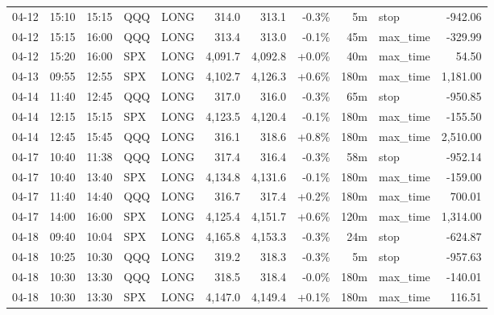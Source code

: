 \documentclass[11pt,a4paper,twoside]{article}
\begin{document}
\begin{center}
\begin{longtable}{>{\color{txtmain}}l l l l l r r r r >{\color{txtmain}}l r}
04-12 & 15:10 & 15:15 & QQQ & LONG & 314.0 & 313.1 & \textcolor{lossred}{-0.3\%} & 5m & stop & \textcolor{lossred}{-942.06} \\
04-12 & 15:15 & 16:00 & QQQ & LONG & 313.4 & 313.0 & \textcolor{lossred}{-0.1\%} & 45m & max\_time & \textcolor{lossred}{-329.99} \\
04-12 & 15:20 & 16:00 & SPX & LONG & 4,091.7 & 4,092.8 & \textcolor{wingreen}{+0.0\%} & 40m & max\_time & \textcolor{wingreen}{54.50} \\
04-13 & 09:55 & 12:55 & SPX & LONG & 4,102.7 & 4,126.3 & \textcolor{wingreen}{+0.6\%} & 180m & max\_time & \textcolor{wingreen}{1,181.00} \\
04-14 & 11:40 & 12:45 & QQQ & LONG & 317.0 & 316.0 & \textcolor{lossred}{-0.3\%} & 65m & stop & \textcolor{lossred}{-950.85} \\
04-14 & 12:15 & 15:15 & SPX & LONG & 4,123.5 & 4,120.4 & \textcolor{lossred}{-0.1\%} & 180m & max\_time & \textcolor{lossred}{-155.50} \\
04-14 & 12:45 & 15:45 & QQQ & LONG & 316.1 & 318.6 & \textcolor{wingreen}{+0.8\%} & 180m & max\_time & \textcolor{wingreen}{2,510.00} \\
04-17 & 10:40 & 11:38 & QQQ & LONG & 317.4 & 316.4 & \textcolor{lossred}{-0.3\%} & 58m & stop & \textcolor{lossred}{-952.14} \\
04-17 & 10:40 & 13:40 & SPX & LONG & 4,134.8 & 4,131.6 & \textcolor{lossred}{-0.1\%} & 180m & max\_time & \textcolor{lossred}{-159.00} \\
04-17 & 11:40 & 14:40 & QQQ & LONG & 316.7 & 317.4 & \textcolor{wingreen}{+0.2\%} & 180m & max\_time & \textcolor{wingreen}{700.01} \\
04-17 & 14:00 & 16:00 & SPX & LONG & 4,125.4 & 4,151.7 & \textcolor{wingreen}{+0.6\%} & 120m & max\_time & \textcolor{wingreen}{1,314.00} \\
04-18 & 09:40 & 10:04 & SPX & LONG & 4,165.8 & 4,153.3 & \textcolor{lossred}{-0.3\%} & 24m & stop & \textcolor{lossred}{-624.87} \\
04-18 & 10:25 & 10:30 & QQQ & LONG & 319.2 & 318.3 & \textcolor{lossred}{-0.3\%} & 5m & stop & \textcolor{lossred}{-957.63} \\
04-18 & 10:30 & 13:30 & QQQ & LONG & 318.5 & 318.4 & \textcolor{lossred}{-0.0\%} & 180m & max\_time & \textcolor{lossred}{-140.01} \\
04-18 & 10:30 & 13:30 & SPX & LONG & 4,147.0 & 4,149.4 & \textcolor{wingreen}{+0.1\%} & 180m & max\_time & \textcolor{wingreen}{116.51} \\

\end{longtable}
\end{center}
\end{document}
